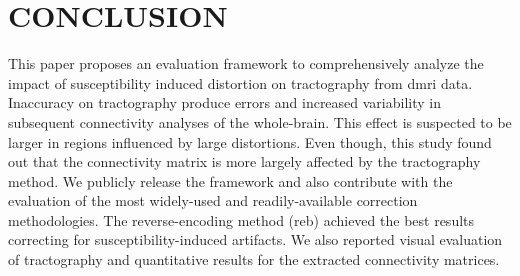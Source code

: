 \section{CONCLUSION}

This paper proposes an evaluation framework to
comprehensively analyze the impact of susceptibility
induced distortion on tractography from \gls*{dmri}
data. Inaccuracy on tractography produce errors
and increased variability in subsequent connectivity 
analyses of the whole-brain. This effect is suspected
to be larger in regions influenced by large distortions.
Even though, this study found out that the connectivity
matrix is more largely affected by the tractography method.
We publicly release the framework and also contribute
with the evaluation of the most widely-used and
readily-available correction methodologies. 
The reverse-encoding method (\gls*{reb}) achieved the
best results correcting for susceptibility-induced 
artifacts. We also reported visual evaluation of 
tractography and quantitative results for the 
extracted connectivity matrices.